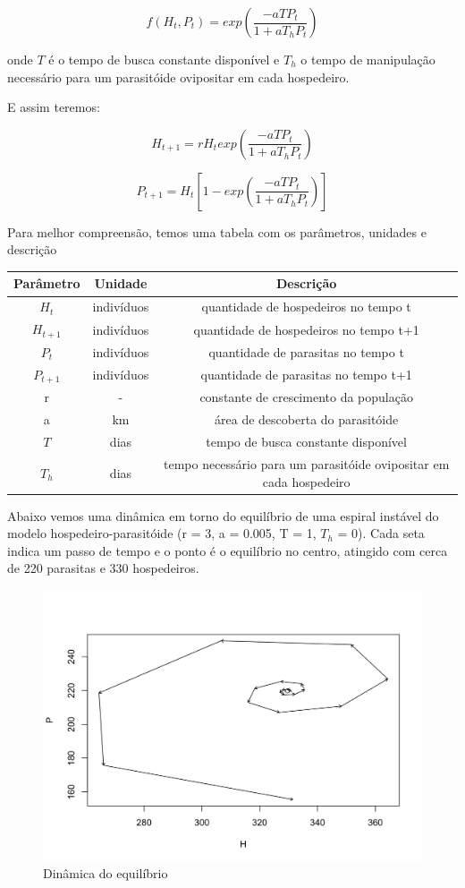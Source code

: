 $$f(H_t, P_t) = exp(\frac{-aTP_t}{1 + a T_h P_t})$$

onde $T$ é o tempo de busca constante disponível e $T_h$ o tempo de manipulação necessário para um parasitóide ovipositar em cada hospedeiro.

E assim teremos: 

$$H_{t+1} = rH_t exp(\frac{-aTP_t}{1 + a T_h P_t})$$

$$P_{t+1} = H_t [1-exp(\frac{-aTP_t}{1 + a T_h P_t})]$$

Para melhor compreensão, temos uma tabela com os parâmetros, unidades e descrição

\bigskip
\begin{tabular}{|c|c|c|}
            \hline
            Parâmetro & Unidade & Descrição\tabularnewline
            \hline
            $H_t$ & indivíduos & quantidade de hospedeiros no tempo t \tabularnewline
            \hline
            $H_{t+1}$ & indivíduos & quantidade de hospedeiros no tempo t+1 \tabularnewline
            \hline
            $P_t$ & indivíduos & quantidade de parasitas no tempo t \tabularnewline
            \hline
            $P_{t+1}$ & indivíduos & quantidade de parasitas no tempo t+1 \tabularnewline
            \hline
            
            r & - & constante de crescimento da população \tabularnewline
            \hline
            a & km & área de descoberta do parasitóide \tabularnewline
            \hline
            $T$ & dias &  tempo de busca constante disponível \tabularnewline
            \hline
            $T_h$ & dias & tempo necessário para um parasitóide ovipositar em cada hospedeiro \tabularnewline
            \hline
\end{tabular}

\bigskip

Abaixo vemos uma dinâmica em torno do equilíbrio de uma espiral instável do modelo hospedeiro-parasitóide (r = 3, a = 0.005, T = 1, $T_h$ = 0). Cada seta indica um passo de tempo e o ponto é o equilíbrio no centro, atingido com cerca de 220 parasitas e 330 hospedeiros.

\begin{figure}[h!]
            \centering
            \includegraphics[scale=0.3]{Img/unnamed-chunk-114-1.png}
            \caption{Dinâmica do equilíbrio}
        \end{figure}
        
